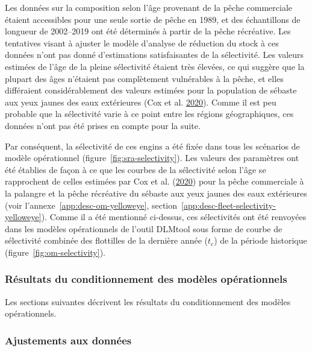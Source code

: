 \documentclass[11pt]{book}
\begin{document}
Les données sur la composition selon l'âge provenant de la pêche commerciale étaient accessibles pour une seule sortie de pêche en 1989, et des échantillons de longueur de 2002--2019 ont été déterminés à partir de la pêche récréative. Les tentatives visant à ajuster le modèle d'analyse de réduction du stock à ces données n'ont pas donné d'estimations satisfaisantes de la sélectivité. Les valeurs estimées de l'âge de la pleine sélectivité étaient très élevées, ce qui suggère que la plupart des âges n'étaient pas complètement vulnérables à la pêche, et elles différaient considérablement des valeurs estimées pour la population de sébaste aux yeux jaunes des eaux extérieures (Cox et al. \protect\hyperlink{ref-cox2020}{2020}). Comme il est peu probable que la sélectivité varie à ce point entre les régions géographiques, ces données n'ont pas été prises en compte pour la suite.

Par conséquent, la sélectivité de ces engins a été fixée dans tous les scénarios de modèle opérationnel (figure~\ref{fig:sra-selectivity}). Les valeurs des paramètres ont été établies de façon à ce que les courbes de la sélectivité selon l'âge se rapprochent de celles estimées par Cox et al. (\protect\hyperlink{ref-cox2020}{2020}) pour la pêche commerciale à la palangre et la pêche récréative du sébaste aux yeux jaunes des eaux extérieures (voir l'annexe~\ref{app:desc-om-yelloweye}, section~\ref{app:desc-fleet-selectivity-yelloweye}). Comme il a été mentionné ci-dessus, ces sélectivités ont été renvoyées dans les modèles opérationnels de l'outil DLMtool sous forme de courbe de sélectivité combinée des flottilles de la dernière année (\(t_c\)) de la période historique (figure~\ref{fig:om-selectivity}).

\hypertarget{sec:approach3-conditioning-results}{%
\subsubsection{Résultats du conditionnement des modèles opérationnels}\label{sec:approach3-conditioning-results}}

Les sections suivantes décrivent les résultats du conditionnement des modèles opérationnels.

\hypertarget{sec:approach3-conditioning-indices}{%
\subsubsection{Ajustements aux données}\label{sec:approach3-conditioning-indices}}
\end{document}
